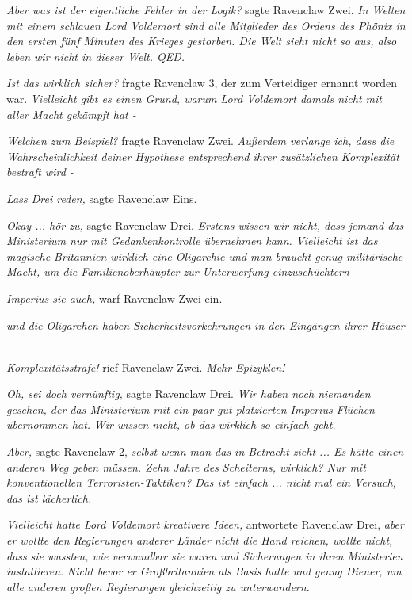 \emph{Aber was ist der eigentliche Fehler in der Logik?} sagte Ravenclaw Zwei.
\emph{In Welten mit einem schlauen Lord Voldemort sind alle Mitglieder des
Ordens des Phönix in den ersten fünf Minuten des Krieges gestorben. Die Welt
sieht nicht so aus, also leben wir nicht in dieser Welt. QED.}

\emph{Ist das wirklich sicher?} fragte Ravenclaw 3, der zum Verteidiger ernannt
worden war. \emph{Vielleicht gibt es einen Grund, warum Lord Voldemort damals
nicht mit aller Macht gekämpft hat -}

\emph{Welchen zum Beispiel?} fragte Ravenclaw Zwei. \emph{Außerdem verlange ich,
dass die Wahrscheinlichkeit deiner Hypothese entsprechend ihrer zusätzlichen
Komplexität bestraft wird -}

\emph{Lass Drei reden,} sagte Ravenclaw Eins.

\emph{Okay ... hör zu,} sagte Ravenclaw Drei. \emph{Erstens wissen wir nicht,
dass jemand das Ministerium nur mit Gedankenkontrolle übernehmen kann.
Vielleicht ist das magische Britannien wirklich eine Oligarchie und man braucht
genug militärische Macht, um die Familienoberhäupter zur Unterwerfung
einzuschüchtern -}

\emph{Imperius sie auch,} warf Ravenclaw Zwei ein. -

\emph{und die Oligarchen haben Sicherheitsvorkehrungen in den Eingängen ihrer
Häuser} -

\emph{Komplexitätsstrafe!} rief Ravenclaw Zwei. \emph{Mehr Epizyklen!} -

\emph{Oh, sei doch vernünftig,} sagte Ravenclaw Drei. \emph{Wir haben noch
niemanden gesehen, der das Ministerium mit ein paar gut platzierten
Imperius-Flüchen übernommen hat.} \emph{Wir wissen nicht, ob das wirklich so
einfach geht.}

\emph{Aber,} sagte Ravenclaw 2, \emph{selbst wenn man das in Betracht zieht ...
Es hätte einen anderen Weg geben müssen. Zehn Jahre des Scheiterns, wirklich?
Nur mit konventionellen Terroristen-Taktiken? Das ist einfach ... nicht mal ein
Versuch, das ist lächerlich.}

\emph{Vielleicht hatte Lord Voldemort kreativere Ideen,} antwortete Ravenclaw
Drei,\emph{ aber er wollte den Regierungen anderer Länder nicht die Hand
reichen, wollte nicht, dass} \emph{sie wussten, wie verwundbar sie waren und
Sicherungen in ihren Ministerien installieren}. \emph{Nicht bevor er
Großbritannien als Basis hatte und genug Diener, um alle anderen großen
Regierungen gleichzeitig zu unterwandern.}

